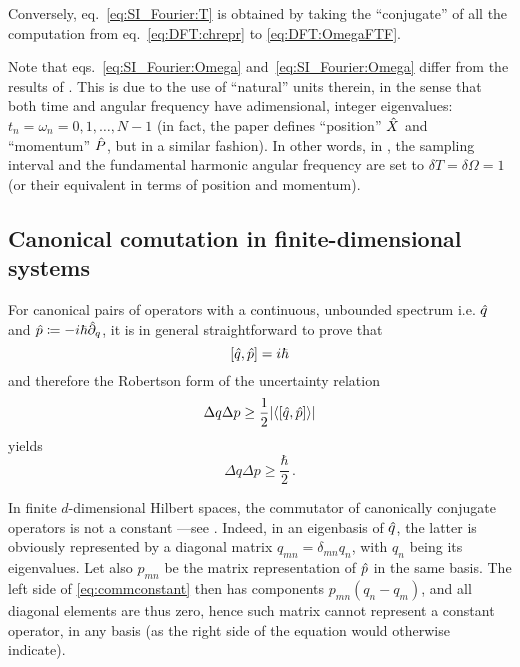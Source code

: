 Conversely, eq.~\eqref{eq:SI_Fourier:T} is obtained by
taking the ``conjugate'' of all the computation
from eq.~\eqref{eq:DFT:chrepr} to \eqref{eq:DFT:OmegaFTF}.

Note that eqs.~\eqref{eq:SI_Fourier:Omega} and~\eqref{eq:SI_Fourier:Omega}
differ from the results of \cite{FiniteHilb}.
This is due to the use of
``natural'' units therein,
in the sense that
both time and angular frequency
have adimensional, integer eigenvalues:
$t_n = \omega_n = 0, 1, \dots, N-1$
(in fact, the paper defines ``position'' $\hat{X}$ and ``momentum'' $\hat{P}$,
but in a similar fashion).
In other words, in \citereset\cite{FiniteHilb}, the sampling interval and the fundamental harmonic angular frequency
are set to $\delta{T} = \delta{\Omega} = 1$ (or their equivalent in terms of position and momentum).

\subsection{Canonical comutation in finite-dimensional systems}\label{sec:finite_uncertainty}
\citereset
For canonical pairs of operators with a continuous, unbounded spectrum i.e.
$\hat{q}$ and $\hat{p} \coloneqq -i\hbar\hat{\partial}_{q}$,
it is in general straightforward to prove that
\begin{equation}\label{eq:commconstant}
  \qty[\hat{q}, \hat{p}] = i\hbar
\end{equation}
and therefore
the Robertson form of the uncertainty relation
\begin{equation}\label{eq:robertsonconstant}
  \Delta q \Delta p \geq { \frac{1}{2} \qty|\ev{\qty[\op{q}, \op{p}]}| }
\end{equation}
yields
\begin{equation}\label{eq:min_uncertain_constant}
  \Delta q \Delta p \geq { \frac{\hbar}{2} } \, \text{.}
\end{equation}

In finite $d$-dimensional Hilbert spaces, the commutator of canonically conjugate operators
is not a constant ---see \cite{Weyl:FiniteComm}.
Indeed, in an eigenbasis of $\hat{q}$,
the latter is obviously represented by a diagonal matrix $q_{mn} = \delta_{mn}q_{n}$,
with $q_n$ being its eigenvalues. Let also $p_{mn}$ be the matrix representation of $\hat{p}$
in the same basis. The left side of \eqref{eq:commconstant} then has components
$p_{mn}(q_n - q_m)$, and all diagonal elements are thus zero,
hence such matrix cannot represent a constant operator, in any basis
(as the right side of the equation would otherwise indicate).

